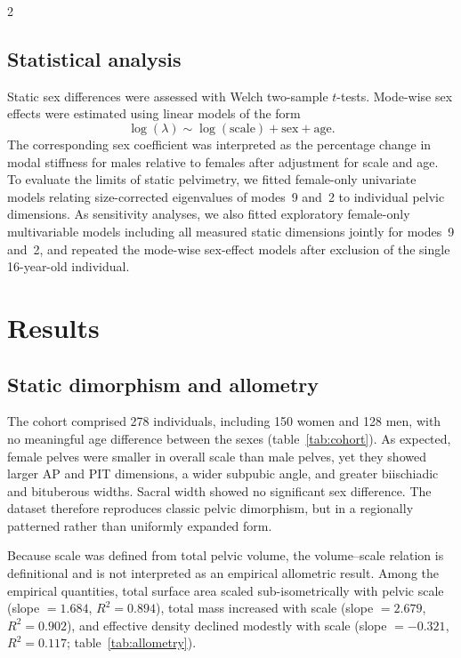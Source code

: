 \documentclass[openacc]{rsproca_new}
\begin{document}
\begin{multicols}{2}
\subsection{Statistical analysis}

Static sex differences were assessed with Welch two-sample $t$-tests. Mode-wise sex effects were estimated using linear models of the form
\begin{equation}
\log(\lambda) \sim \log(\mathrm{scale}) + \mathrm{sex} + \mathrm{age}.
\end{equation}
The corresponding sex coefficient was interpreted as the percentage change in modal stiffness for males relative to females after adjustment for scale and age. To evaluate the limits of static pelvimetry, we fitted female-only univariate models relating size-corrected eigenvalues of modes~9 and~2 to individual pelvic dimensions. As sensitivity analyses, we also fitted exploratory female-only multivariable models including all measured static dimensions jointly for modes~9 and~2, and repeated the mode-wise sex-effect models after exclusion of the single 16-year-old individual.

\section{Results}

\subsection{Static dimorphism and allometry}

The cohort comprised 278 individuals, including 150 women and 128 men, with no meaningful age difference between the sexes (table~\ref{tab:cohort}). As expected, female pelves were smaller in overall scale than male pelves, yet they showed larger AP and PIT dimensions, a wider subpubic angle, and greater biischiadic and bituberous widths. Sacral width showed no significant sex difference. The dataset therefore reproduces classic pelvic dimorphism, but in a regionally patterned rather than uniformly expanded form.

Because scale was defined from total pelvic volume, the volume--scale relation is definitional and is not interpreted as an empirical allometric result. Among the empirical quantities, total surface area scaled sub-isometrically with pelvic scale (slope $=1.684$, $R^2=0.894$), total mass increased with scale (slope $=2.679$, $R^2=0.902$), and effective density declined modestly with scale (slope $=-0.321$, $R^2=0.117$; table~\ref{tab:allometry}).


\end{multicols}
\end{document}
